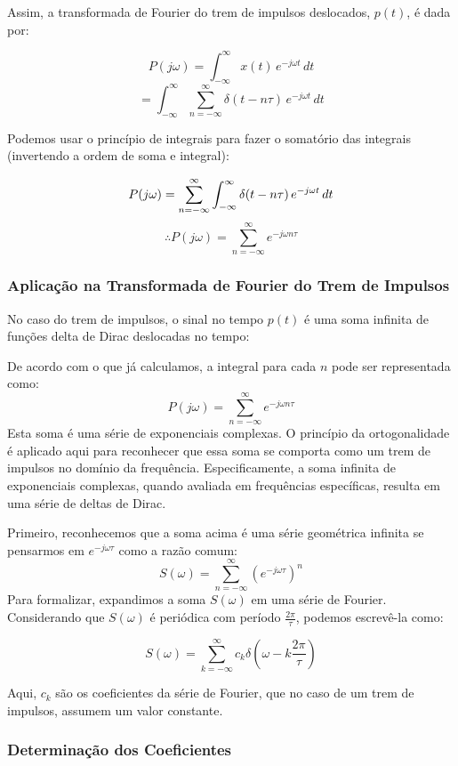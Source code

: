 Assim, a transformada de Fourier do trem de impulsos deslocados, $p(t)$, é dada por:

$$
P(j\omega) = \int_{-\infty}^{\infty} x(t) \, e^{-j\omega t} \, dt
$$
$$
= \int_{-\infty}^{\infty} \sum_{n=-\infty}^{\infty} \delta(t - n\tau) \, e^{-j\omega t} \, dt
$$

Podemos usar o princípio de integrais para fazer o somatório das integrais (invertendo a ordem de soma e integral):

$$
P(j\omega) = \sum_{n=-\infty}^{\infty} \int_{-\infty}^{\infty} \delta(t - n\tau) \, e^{-j\omega t} \, dt \\
$$
\begin{equation}
\therefore
P(j\omega) = \sum_{n=-\infty}^{\infty} e^{-j\omega n\tau}
\end{equation}

\subsubsection{Aplicação na Transformada de Fourier do Trem de Impulsos}

No caso do trem de impulsos, o sinal no tempo $p(t)$ é uma soma infinita de funções delta de Dirac deslocadas no tempo:

De acordo com o que já calculamos, a integral para cada $n$ pode ser representada como:
$$
P(j\omega) = \sum_{n=-\infty}^{\infty} e^{-j\omega n\tau}
$$
Esta soma é uma série de exponenciais complexas. O princípio da ortogonalidade é aplicado aqui para reconhecer que essa soma se comporta como um trem de impulsos no domínio da frequência. Especificamente, a soma infinita de exponenciais complexas, quando avaliada em frequências específicas, resulta em uma série de deltas de Dirac.

Primeiro, reconhecemos que a soma acima é uma série geométrica infinita se pensarmos em $e^{-j\omega\tau}$ como a razão comum:
$$
S(\omega) = \sum_{n=-\infty}^{\infty} \left(e^{-j\omega \tau}\right)^n
$$
Para formalizar, expandimos a soma $S(\omega)$ em uma série de Fourier. Considerando que $S(\omega)$ é periódica com período $\frac{2\pi}{\tau}$, podemos escrevê-la como:

$$
S(\omega) = \sum_{k=-\infty}^{\infty} c_k \delta\left(\omega - k\frac{2\pi}{\tau}\right)
$$

Aqui, $c_k$ são os coeficientes da série de Fourier, que no caso de um trem de impulsos, assumem um valor constante.

\subsubsection{Determinação dos Coeficientes}

